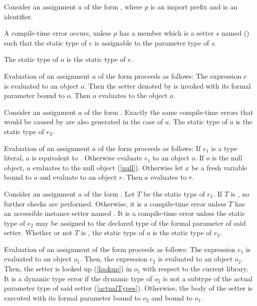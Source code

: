 \documentclass[makeidx]{article}
\begin{document}
{\LMHash{}%
Consider an assignment $a$ of the form ,
where $p$ is an import prefix and \id{} is an identifier.

\LMHash{}%
A compile-time error occurs,
unless $p$ has a member which is a setter $s$ named 
()
such that the static type of $e$
is assignable to the parameter type of $s$.

\LMHash{}%
The static type of $a$ is the static type of $e$.

\LMHash{}%
\LMHash{}%
Evaluation of an assignment $a$ of the form 
proceeds as follows:
The expression $e$ is evaluated to an object $o$.
Then the setter denoted by  is invoked
with its formal parameter bound to $o$.
Then $a$ evaluates to the object $o$.
\EndCase

\LMHash{}%
Consider an assignment $a$ of the form .
Exactly the same compile-time errors that would be caused by
 are also generated in the case of $a$.
The static type of $a$ is the static type of $e_2$.

\LMHash{}%
Evaluation of an assignment $a$ of the form 
proceeds as follows:
If $e_1$ is a type literal, $a$ is equivalent to .
Otherwise evaluate $e_1$ to an object $o$.
If $o$ is the null object, $a$ evaluates to the null object (\ref{null}).
Otherwise let $x$ be a fresh variable bound to $o$
and evaluate  to an object $r$.
Then $a$ evaluates to $r$.
\EndCase

\LMHash{}%
Consider an assignment $a$ of the form .
Let $T$ be the static type of $e_1$.
If $T$ is \DYNAMIC{}, no further checks are performed.
Otherwise, it is a compile-time error unless
$T$ has an accessible instance setter named .
It is a compile-time error unless the static type of $e_2$
may be assigned to the declared type of the formal parameter of said setter.
Whether or not $T$ is \DYNAMIC{},
the static type of $a$ is the static type of $e_2$.

\LMHash{}%
Evaluation of an assignment of the form 
proceeds as follows:
The expression $e_1$ is evaluated to an object $o_1$.
Then, the expression $e_2$ is evaluated to an object $o_2$.
Then, the setter  is looked up (\ref{lookup}) in $o_1$ with respect to the current library.
It is a dynamic type error if the dynamic type of $o_2$
is not a subtype of the actual parameter type of said setter
(\ref{actualTypes}).
Otherwise, the body of the setter is executed with its formal parameter bound to $o_2$ and \THIS{} bound to $o_1$.

}
\end{document}
